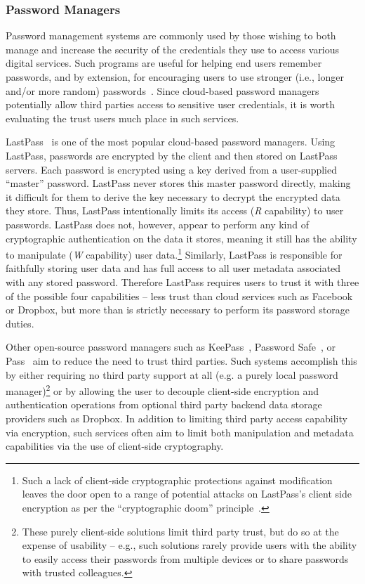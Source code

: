 \subsubsection{Password Managers}

Password management systems are commonly used by those wishing to both
manage and increase the security of the credentials they use to access
various digital services. Such programs are useful for helping end
users remember passwords, and by extension, for encouraging users to
use stronger (i.e., longer and/or more random)
passwords~\cite{brodkin-passman, krebs-passwords,
  schneier-passwords}. Since cloud-based password managers potentially
allow third parties access to sensitive user credentials, it is worth
evaluating the trust users much place in such services.

LastPass~\cite{lastpass} is one of the most popular cloud-based
password managers. Using LastPass, passwords are encrypted by the
client and then stored on LastPass servers. Each password is encrypted
using a key derived from a user-supplied ``master'' password. LastPass
never stores this master password directly, making it difficult for
them to derive the key necessary to decrypt the encrypted data they
store. Thus, LastPass intentionally limits its access (\emph{R}
capability) to user passwords. LastPass does not, however, appear to
perform any kind of cryptographic authentication on the data it
stores, meaning it still has the ability to manipulate (\emph{W}
capability) user data.\footnote{Such a lack of client-side
  cryptographic protections against modification leaves the door open
  to a range of potential attacks on LastPass's client side encryption
  as per the ``cryptographic doom''
  principle~\cite{marlinspike-doom}.} Similarly, LastPass is
responsible for faithfully storing user data and has full access to
all user metadata associated with any stored password. Therefore
LastPass requires users to trust it with three of the possible four
capabilities -- less trust than cloud services such as Facebook or
Dropbox, but more than is strictly necessary to perform its password
storage duties.

Other open-source password managers such as KeePass~\cite{keepass},
Password Safe~\cite{passwordsafe}, or Pass~\cite{pass} aim to reduce
the need to trust third parties. Such systems accomplish this by
either requiring no third party support at all (e.g. a purely local
password manager)\footnote{These purely client-side solutions limit
  third party trust, but do so at the expense of usability -- e.g.,
  such solutions rarely provide users with the ability to easily
  access their passwords from multiple devices or to share passwords
  with trusted colleagues.} or by allowing the user to decouple
client-side encryption and authentication operations from optional
third party backend data storage providers such as Dropbox. In
addition to limiting third party access capability via encryption,
such services often aim to limit both manipulation and metadata
capabilities via the use of client-side cryptography.

